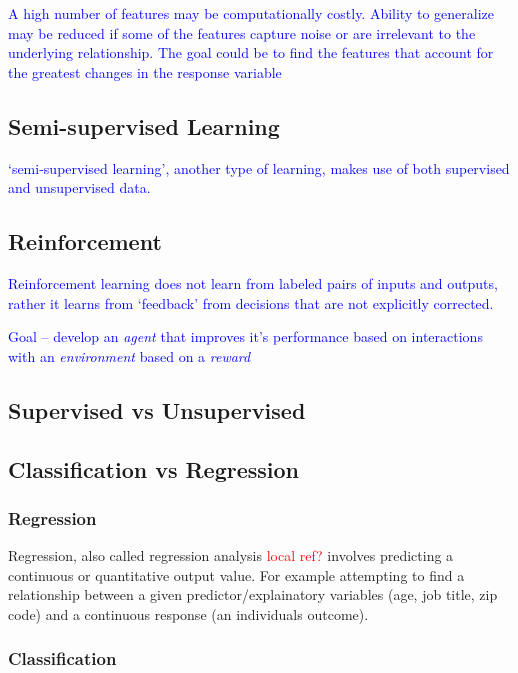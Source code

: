 
\textcolor{blue}{A high number of features may be computationally costly. Ability to generalize may be reduced if some of the features capture noise or are irrelevant to the underlying relationship. The goal could be to find the features that account for the greatest changes in the response variable}


\subsection{Semi-supervised Learning}

\textcolor{blue}{`semi-supervised learning', another type of learning, makes use of both supervised and unsupervised data.}

\subsection{Reinforcement}

\textcolor{blue}{Reinforcement learning does not learn from labeled pairs of inputs and outputs, rather it learns from `feedback' from decisions that are not explicitly corrected.}

\textcolor{blue}{Goal -- develop an \emph{agent} that improves it's performance based on interactions with an \emph{environment} based on a \emph{reward}}

\subsection{Supervised vs Unsupervised}

\subsection{Classification vs Regression}

\subsubsection{Regression} 

Regression, also called regression analysis \textcolor{red}{local ref?} involves predicting a continuous or quantitative output value. For example attempting to find a relationship between a given predictor/explainatory variables (age, job title, zip code) and a continuous response (an individuals outcome).

\subsubsection{Classification} 

